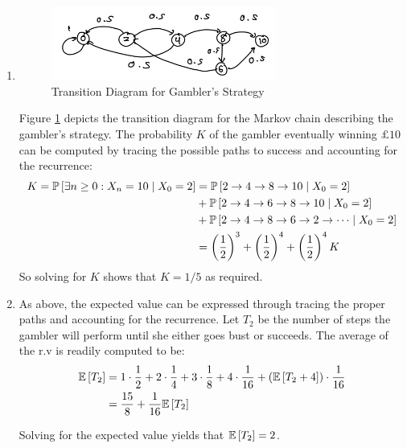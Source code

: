 \documentclass[12pt]{article}%
\begin{document}
\begin{enumerate}
  \item
        \begin{figure}[h]
          \centering
          \includegraphics[width=0.7\textwidth]{mc3}
          \caption{Transition Diagram for Gambler's Strategy}
          \label{fig:mc3}
        \end{figure}


        Figure \ref{fig:mc3} depicts the transition diagram for the Markov chain describing the gambler's strategy. The probability $K$ of the gambler eventually winning $\pounds 10$ can be computed by tracing the possible paths to success and accounting for the recurrence:
%
        \begin{align*}
          K = \mathbb{P}\left[{\exists n \geq 0: X_{n} = 10}\mid {X_{0} = 2}\right] & =  \mathbb{P}\left[{2 \rightarrow 4 \rightarrow 8 \rightarrow 10}\mid {X_{0} = 2}\right] \\
                                                             & + \mathbb{P}\left[{2 \rightarrow 4 \rightarrow 6 \rightarrow 8 \rightarrow 10}\mid {X_{0} = 2}\right] \\
                                                             & + \mathbb{P}\left[{2 \rightarrow 4 \rightarrow 8 \rightarrow 6 \rightarrow 2 \rightarrow \cdots}\mid {X_{0} = 2}\right] \\
                                                                 & = \left(\frac{1}{2}\right)^{3} + \left(\frac{1}{2}\right)^{4} + \left(\frac{1}{2}\right)^{4} K
        \end{align*}
        So solving for $K$ shows that $K = 1/5$ as required.

  \item
        As above, the expected value can be expressed through tracing the proper paths and accounting for the recurrence. Let $T_{2}$ be the number of steps the gambler will perform until she either goes bust or succeeds. The average of the r.v is readily computed to be:
        \begin{align*}
          \mathbb{E}\left[T_2\right] & = 1 \cdot \frac{1}{2}+ 2\cdot \frac{1}{4} + 3 \cdot \frac{1}{8} + 4 \cdot \frac{1}{16} + \left( \mathbb{E}\left[T_2 + 4\right]\right)\cdot \frac{1}{16} \\
          & = \frac{15}{8} + \frac{1}{16} \mathbb{E}\left[T_2\right]
        \end{align*}

        Solving for the expected value yields that $\mathbb{E}\left[T_{2}\right] = 2$.
\end{enumerate}
\end{document}
